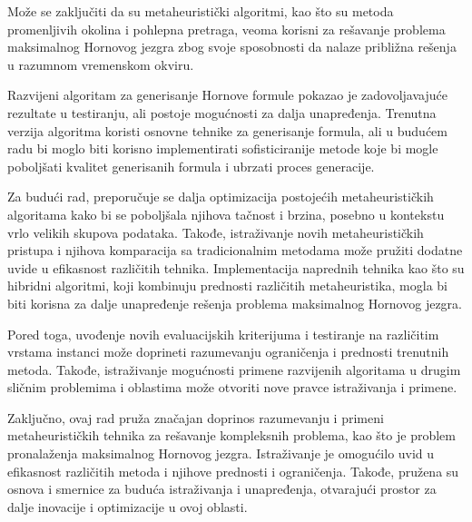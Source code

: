 \documentclass[12pt,oneside]{memoir}
\begin{document}
Može se zaključiti da su metaheuristički algoritmi, kao što su metoda promenljivih okolina i pohlepna pretraga, veoma korisni za rešavanje problema maksimalnog Hornovog jezgra zbog svoje sposobnosti da nalaze približna rešenja u razumnom vremenskom okviru.

Razvijeni algoritam za generisanje Hornove formule pokazao je zadovoljavajuće rezultate u testiranju, ali postoje mogućnosti za dalja unapređenja. Trenutna verzija algoritma koristi osnovne tehnike za generisanje formula, ali u budućem radu bi moglo biti korisno implementirati sofisticiranije metode koje bi mogle poboljšati kvalitet generisanih formula i ubrzati proces generacije.

Za budući rad, preporučuje se dalja optimizacija postojećih metaheurističkih algoritama kako bi se poboljšala njihova tačnost i brzina, posebno u kontekstu vrlo velikih skupova podataka. Takođe, istraživanje novih metaheurističkih pristupa i njihova komparacija sa tradicionalnim metodama može pružiti dodatne uvide u efikasnost različitih tehnika. Implementacija naprednih tehnika kao što su hibridni algoritmi, koji kombinuju prednosti različitih metaheuristika, mogla bi biti korisna za dalje unapređenje rešenja problema maksimalnog Hornovog jezgra.

Pored toga, uvođenje novih evaluacijskih kriterijuma i testiranje na različitim vrstama instanci može doprineti razumevanju ograničenja i prednosti trenutnih metoda. Takođe, istraživanje mogućnosti primene razvijenih algoritama u drugim sličnim problemima i oblastima može otvoriti nove pravce istraživanja i primene.

Zaključno, ovaj rad pruža značajan doprinos razumevanju i primeni metaheurističkih tehnika za rešavanje kompleksnih problema, kao što je problem pronalaženja maksimalnog Hornovog jezgra. Istraživanje je omogućilo uvid u efikasnost različitih metoda i njihove prednosti i ograničenja. Takođe, pružena su osnova i smernice za buduća istraživanja i unapređenja, otvarajući prostor za dalje inovacije i optimizacije u ovoj oblasti.

% 


\literatura
\end{document}
